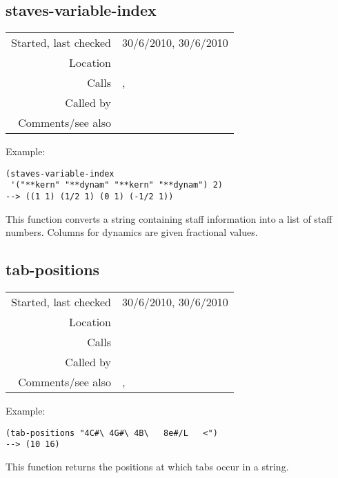 \subsection*{staves-variable-index}\label{fun:staves-variable-index}

\vspace{0.3cm}
\begin{tabular}{r|p{8cm}}
Started, last checked & 30/6/2010, 30/6/2010 \\
Location & \nameref{sec:kern} \\
Calls & \nameref{fun:add-to-list}, \nameref{fun:first-n-naturals} \\
Called by & \nameref{fun:staves-info2staves-variable-robust} \\
Comments/see also &
\end{tabular}

\vspace{0.5cm}
\noindent Example:
\begin{verbatim}
(staves-variable-index
 '("**kern" "**dynam" "**kern" "**dynam") 2)
--> ((1 1) (1/2 1) (0 1) (-1/2 1))
\end{verbatim}

\noindent This function converts a string containing
staff information into a list of staff numbers.
Columns for dynamics are given fractional values.


\subsection*{tab-positions}\label{fun:tab-positions}

\vspace{0.3cm}
\begin{tabular}{r|p{8cm}}
Started, last checked & 30/6/2010, 30/6/2010 \\
Location & \nameref{sec:kern} \\
Calls & \\
Called by & \nameref{fun:tab-separated-string2list} \\
Comments/see also & \nameref{fun:comma-positions}, \nameref{fun:space-bar-positions}
\end{tabular}

\vspace{0.5cm}
\noindent Example:
\begin{Verbatim}[showtabs=true]
(tab-positions "4C#\ 4G#\ 4B\	8e#/L	<")
--> (10 16)
\end{Verbatim}

\noindent This function returns the positions at which
tabs occur in a string.



